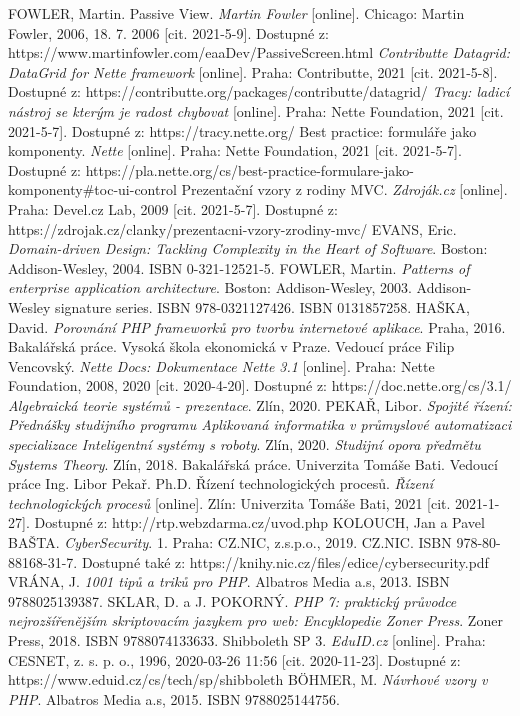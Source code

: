 \begin{thebibliography}{41}
FOWLER, Martin. Passive View. \textit{Martin Fowler} [online]. Chicago: Martin Fowler, 2006, 18. 7. 2006 [cit. 2021-5-9]. Dostupné z: https://www.martinfowler.com/eaaDev/PassiveScreen.html
\textit{Contributte Datagrid: DataGrid for Nette framework} [online]. Praha: Contributte, 2021 [cit. 2021-5-8]. Dostupné z: https://contributte.org/packages/contributte/datagrid/
\textit{Tracy: ladicí nástroj se kterým je radost chybovat} [online]. Praha: Nette Foundation, 2021 [cit. 2021-5-7]. Dostupné z: https://tracy.nette.org/
Best practice: formuláře jako komponenty. \textit{Nette} [online]. Praha: Nette Foundation, 2021 [cit. 2021-5-7]. Dostupné z: https://pla.nette.org/cs/best-practice-formulare-jako-komponenty\#toc-ui-control
Prezentační vzory z rodiny MVC. \textit{Zdroják.cz} [online]. Praha: Devel.cz Lab, 2009 [cit. 2021-5-7]. Dostupné z: https://zdrojak.cz/clanky/prezentacni-vzory-zrodiny-mvc/
EVANS, Eric. \textit{Domain-driven Design: Tackling Complexity in the Heart of Software}. Boston: Addison-Wesley, 2004. ISBN 0-321-12521-5.
FOWLER, Martin. \textit{Patterns of enterprise application architecture}. Boston: Addison-Wesley, 2003. Addison-Wesley signature series. ISBN 978-0321127426.
ISBN 0131857258.
HAŠKA, David. \textit{Porovnání PHP frameworků pro tvorbu internetové aplikace}. Praha, 2016. Bakalářská práce. Vysoká škola ekonomická v Praze. Vedoucí práce Filip Vencovský.
\textit{Nette Docs: Dokumentace Nette 3.1} [online]. Praha: Nette Foundation, 2008, 2020 [cit. 2020-4-20]. Dostupné z: https://doc.nette.org/cs/3.1/
\textit{Algebraická teorie systémů - prezentace}. Zlín, 2020.
PEKAŘ, Libor. \textit{Spojité řízení: Přednášky studijního programu Aplikovaná informatika v průmyslové automatizaci specializace Inteligentní systémy s roboty}. Zlín, 2020.
\textit{Studijní opora předmětu Systems Theory}. Zlín, 2018. Bakalářská práce. Univerzita Tomáše Bati. Vedoucí práce Ing. Libor Pekař. Ph.D.
Řízení technologických procesů. \textit{Řízení technologických procesů} [online]. Zlín: Univerzita Tomáše Bati, 2021 [cit. 2021-1-27]. Dostupné z: http://rtp.webzdarma.cz/uvod.php
KOLOUCH, Jan a Pavel BAŠTA. \textit{CyberSecurity}. 1. Praha: CZ.NIC, z.s.p.o., 2019. CZ.NIC. ISBN 978-80-88168-31-7. Dostupné také z: https://knihy.nic.cz/files/edice/cybersecurity.pdf
VRÁNA, J. \textit{1001 tipů a triků pro PHP}. Albatros Media a.s, 2013. ISBN 9788025139387.
SKLAR, D. a J. POKORNÝ. \textit{PHP 7: praktický průvodce nejrozšířenějším skriptovacím jazykem pro web: Encyklopedie Zoner Press}. Zoner Press, 2018. ISBN 9788074133633.
Shibboleth SP 3. \textit{EduID.cz} [online]. Praha: CESNET, z. s. p. o., 1996, 2020-03-26 11:56 [cit. 2020-11-23]. Dostupné z: https://www.eduid.cz/cs/tech/sp/shibboleth
BÖHMER, M. \textit{Návrhové vzory v PHP}. Albatros Media a.s, 2015. ISBN 9788025144756.

\end{thebibliography}